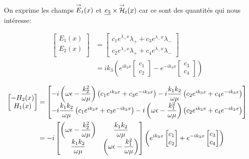On exprime les champs ${\overset{\rightarrow}{E}}_t(x)$ et $\underline{e_3} \times {\overset{\rightarrow}{\mathcal{H}}}_t(x)$ car ce sont des quantités qui nous intéresse:

\begin{align}
    \begin{bmatrix}
        E_1(x)\\
        E_2(x)\\
    \end{bmatrix}
    &=
    \begin{bmatrix}
        c_1 e^{\lambda_+ x} \lambda_{+} + c_3 e^{\lambda_- x} \lambda_{-} \\
        c_2 e^{\lambda_+ x} \lambda_{+} + c_4 e^{\lambda_- x} \lambda_{-}
    \end{bmatrix}\\
    &=ik_3\left( e^{ik_3 x}
    \begin{bmatrix}
        c_1 \\
        c_2
    \end{bmatrix}
    -e^{-ik_3 x}
    \begin{bmatrix}
        c_3 \\
        c_4
    \end{bmatrix}
    \right)
    \label{eq:imp_fourier:plan:generale_E}
\end{align}

\begin{align}
    \begin{bmatrix}
        -H_2(x)\\
        H_1(x)\\
    \end{bmatrix}
    &=
    \begin{bmatrix}
        -i\left(\omega\epsilon - \dfrac{k_2^2}{\omega\mu}\right) \left( c_1 e^{ik_3 x} + c_3 e^{-ik_3 x} \right) - i\dfrac{k_1k_2}{\omega\mu} \left( c_2 e^{ik_3 x} + c_4 e^{-ik_3 x} \right)
        \\
        -i\dfrac{k_1k_2}{\omega\mu} \left( c_1 e^{ik_3 x} + c_3 e^{-ik_3 x} \right) - i\left(\omega\epsilon - \dfrac{k_1^2}{\omega\mu}\right)\left( c_2 e^{ik_3 x} + c_4 e^{-ik_3 x} \right)
    \end{bmatrix} \\
    &=-i
    \begin{bmatrix}
    \left(\omega\epsilon - \dfrac{k_2^2}{\omega\mu}\right) & \dfrac{k_1k_2}{\omega\mu}
    \\
    \dfrac{k_1k_2}{\omega\mu} & \left(\omega\epsilon - \dfrac{k_1^2}{\omega\mu}\right) 
    \end{bmatrix}
    \left(
        e^{ik_3 x}
        \begin{bmatrix}
            c_1 \\
            c_2
        \end{bmatrix}
        +e^{-ik_3 x}
        \begin{bmatrix}
            c_3 \\
            c_4
        \end{bmatrix}
    \right)
    \label{eq:imp_fourier:plan:generale_H}
\end{align}


